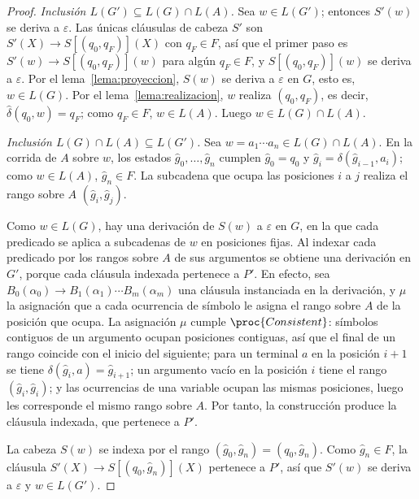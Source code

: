 \documentclass{report}
\theoremstyle{definition}
\theoremstyle{plain}
\theoremstyle{remark}
\begin{document}
\begin{proof}
\emph{Inclusión $L(G') \subseteq L(G) \cap L(A)$.} Sea $w \in L(G')$;
entonces $S'(w)$ se deriva a $\varepsilon$. Las únicas cláusulas de
cabeza $S'$ son $S'(X) \to S[(q_0, q_F)](X)$ con $q_F \in F$, así que el
primer paso es $S'(w) \to S[(q_0, q_F)](w)$ para algún $q_F \in F$, y
$S[(q_0, q_F)](w)$ se deriva a $\varepsilon$. Por el
lema~\ref{lema:proyeccion}, $S(w)$ se deriva a $\varepsilon$ en $G$, esto
es, $w \in L(G)$. Por el lema~\ref{lema:realizacion}, $w$ realiza
$(q_0, q_F)$, es decir, $\hat\delta(q_0, w) = q_F$; como $q_F \in F$,
$w \in L(A)$. Luego $w \in L(G) \cap L(A)$.

\emph{Inclusión $L(G) \cap L(A) \subseteq L(G')$.} Sea
$w = a_1 \cdots a_n \in L(G) \cap L(A)$. En la corrida de $A$ sobre $w$,
los estados $\hat g_0, \ldots, \hat g_n$ cumplen $\hat g_0 = q_0$ y
$\hat g_i = \delta(\hat g_{i-1}, a_i)$; como $w \in L(A)$,
$\hat g_n \in F$. La subcadena que ocupa las posiciones $i$ a $j$ realiza
el rango sobre $A$ $(\hat g_i, \hat g_j)$.

Como $w \in L(G)$, hay una derivación de $S(w)$ a $\varepsilon$ en $G$,
en la que cada predicado se aplica a subcadenas de $w$ en posiciones
fijas. Al indexar cada predicado por los rangos sobre $A$ de sus
argumentos se obtiene una derivación en $G'$, porque cada cláusula
indexada pertenece a $P'$. En efecto, sea $B_0(\alpha_0) \to
B_1(\alpha_1) \cdots B_m(\alpha_m)$ una cláusula instanciada en la
derivación, y $\mu$ la asignación que a cada ocurrencia de símbolo le
asigna el rango sobre $A$ de la posición que ocupa. La asignación $\mu$
cumple $\proc{Consistent}$: símbolos contiguos de un argumento ocupan
posiciones contiguas, así que el final de un rango coincide con el
inicio del siguiente; para un terminal $a$ en la posición $i{+}1$ se
tiene $\delta(\hat g_i, a) = \hat g_{i+1}$; un argumento vacío en la
posición $i$ tiene el rango $(\hat g_i, \hat g_i)$; y las ocurrencias de
una variable ocupan las mismas posiciones, luego les corresponde el
mismo rango sobre $A$. Por tanto, la construcción produce la cláusula
indexada, que pertenece a $P'$.

La cabeza $S(w)$ se indexa por el rango $(\hat g_0, \hat g_n) =
(q_0, \hat g_n)$. Como $\hat g_n \in F$, la cláusula
$S'(X) \to S[(q_0, \hat g_n)](X)$ pertenece a $P'$, así que $S'(w)$ se
deriva a $\varepsilon$ y $w \in L(G')$.
\end{proof}



\end{document}
